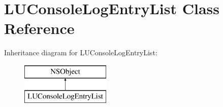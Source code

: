 \hypertarget{interface_l_u_console_log_entry_list}{}\section{L\+U\+Console\+Log\+Entry\+List Class Reference}
\label{interface_l_u_console_log_entry_list}
Inheritance diagram for L\+U\+Console\+Log\+Entry\+List\+:\begin{figure}[H]
\begin{center}
\leavevmode
\includegraphics[height=2.000000cm]{interface_l_u_console_log_entry_list}
\end{center}
\end{figure}

